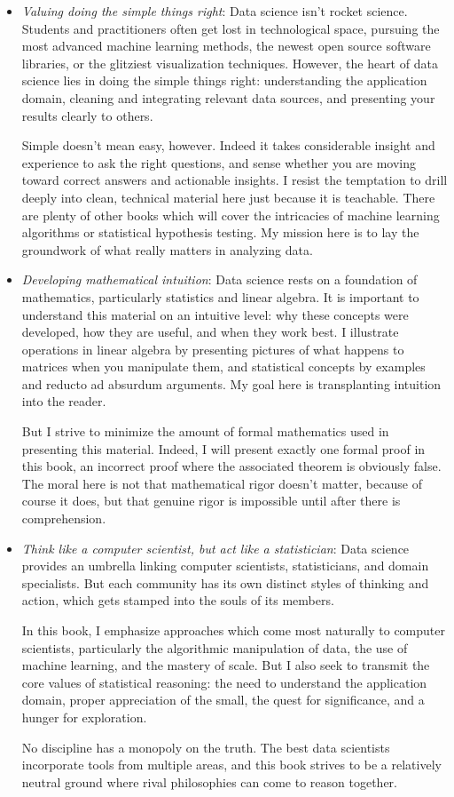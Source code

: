 \documentclass[10pt]{article}
\begin{document}
\begin{itemize}
  \item \textit{Valuing doing the simple things right}: Data science isn't rocket science. Students and practitioners often get lost in technological space, pursuing the most advanced machine learning methods, the newest open source software libraries, or the glitziest visualization techniques. However, the heart of data science lies in doing the simple things right: understanding the application domain, cleaning and integrating relevant data sources, and presenting your results clearly to others.

Simple doesn't mean easy, however. Indeed it takes considerable insight and experience to ask the right questions, and sense whether you are moving toward correct answers and actionable insights. I resist the temptation to drill deeply into clean, technical material here just because it is teachable. There are plenty of other books which will cover the intricacies of machine learning algorithms or statistical hypothesis testing. My mission here is to lay the groundwork of what really matters in analyzing data.

  \item \textit{Developing mathematical intuition}: Data science rests on a foundation of mathematics, particularly statistics and linear algebra. It is important to understand this material on an intuitive level: why these concepts were developed, how they are useful, and when they work best. I illustrate operations in linear algebra by presenting pictures of what happens to matrices when you manipulate them, and statistical concepts by examples and reducto ad absurdum arguments. My goal here is transplanting intuition into the reader.

But I strive to minimize the amount of formal mathematics used in presenting this material. Indeed, I will present exactly one formal proof in this book, an incorrect proof where the associated theorem is obviously false. The moral here is not that mathematical rigor doesn't matter, because of course it does, but that genuine rigor is impossible until after there is comprehension.

  \item \textit{Think like a computer scientist, but act like a statistician}: Data science provides an umbrella linking computer scientists, statisticians, and domain specialists. But each community has its own distinct styles of thinking and action, which gets stamped into the souls of its members.

In this book, I emphasize approaches which come most naturally to computer scientists, particularly the algorithmic manipulation of data, the use of machine learning, and the mastery of scale. But I also seek to transmit the core values of statistical reasoning: the need to understand the application domain, proper appreciation of the small, the quest for significance, and a hunger for exploration.

No discipline has a monopoly on the truth. The best data scientists incorporate tools from multiple areas, and this book strives to be a relatively neutral ground where rival philosophies can come to reason together.
\end{itemize}
\end{document}
